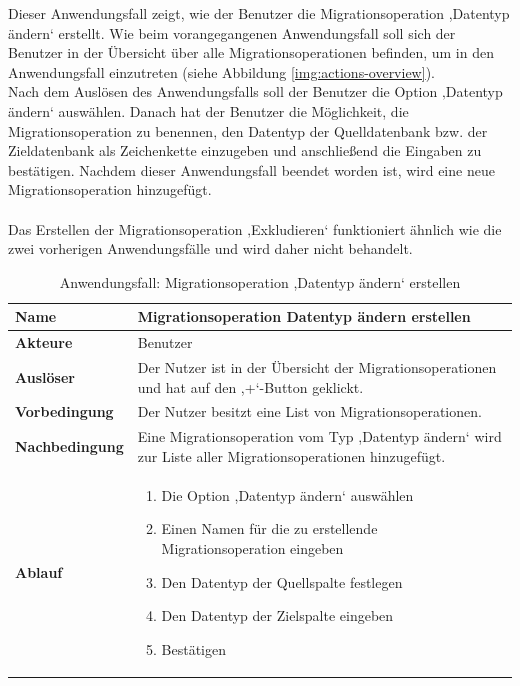 Dieser Anwendungsfall zeigt, wie der Benutzer die Migrationsoperation ,Datentyp ändern‘ erstellt. Wie beim vorangegangenen Anwendungsfall soll sich der Benutzer in der Übersicht über alle Migrationsoperationen befinden, um in den Anwendungsfall einzutreten (siehe Abbildung \ref{img:actions-overview}).\\
Nach dem Auslösen des Anwendungsfalls soll der Benutzer die Option ‚Datentyp ändern‘ auswählen. Danach hat der Benutzer die Möglichkeit, die Migrationsoperation zu benennen, den Datentyp der Quelldatenbank bzw. der Zieldatenbank als Zeichenkette einzugeben und anschließend die Eingaben zu bestätigen. Nachdem dieser Anwendungsfall beendet worden ist, wird eine neue Migrationsoperation hinzugefügt.\\ \\
Das Erstellen der Migrationsoperation ‚Exkludieren‘ funktioniert ähnlich wie die zwei vorherigen Anwendungsfälle und wird daher nicht behandelt.
\begin{table}[H]
	\centering
	\begin{tabular}{ |p{4cm}|p{8cm}| }
		\hline
		\textbf{Name} &  Migrationsoperation Datentyp ändern erstellen \\
		\hline
		\textbf{Akteure} & Benutzer  \\
		\hline
		\textbf{Auslöser} & Der Nutzer ist in der Übersicht der Migrationsoperationen und hat auf den ,+‘-Button geklickt. \\
		\hline
		\textbf{Vorbedingung} & Der Nutzer besitzt eine List von Migrationsoperationen.  \\
		\hline
		\textbf{Nachbedingung} & Eine Migrationsoperation vom Typ ,Datentyp ändern‘ wird zur Liste aller Migrationsoperationen hinzugefügt.  \\
		\hline
		\textbf{Ablauf} & 
		\begin{enumerate}
			\item Die Option ,Datentyp ändern‘ auswählen
			\item Einen Namen für die zu erstellende Migrationsoperation eingeben
			\item Den Datentyp der Quellspalte festlegen
			\item Den Datentyp der Zielspalte eingeben
			\item Bestätigen
		\end{enumerate}   \\
		\hline
		
	\end{tabular}
	\caption{Anwendungsfall: Migrationsoperation ,Datentyp ändern‘ erstellen}
	\label{table:datentyp-ändern}
\end{table}


